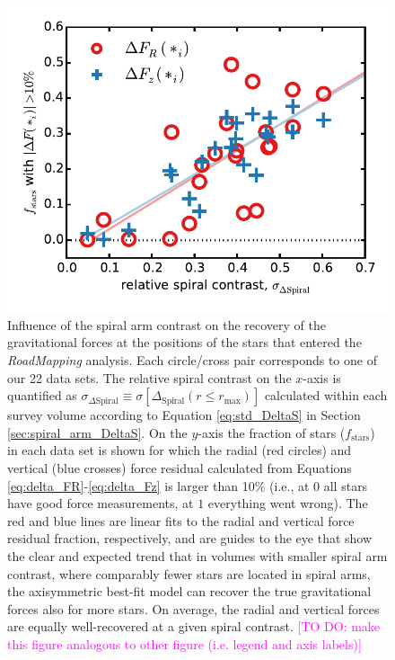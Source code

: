 \documentclass[iop,revtex4,numberedappendix,appendixfloats]{emulateapj}
\newcommand{\RM}{{\sl RoadMapping}}
\newcommand{\Wilma}[1]{\textcolor{Magenta}{#1}}
\begin{document}
\begin{figure}[!htbp]
\centering
\includegraphics[width=\columnwidth]{fig/MNdHHdiffSph2_plot_stdkappa_vs_frac10star_3.pdf}
\caption{Influence of the spiral arm contrast on the recovery of the gravitational forces at the positions of the stars that entered the \RM{} analysis. Each circle/cross pair corresponds to one of our 22 data sets. The relative spiral contrast on the $x$-axis is quantified as $\sigma_{\Delta\text{Spiral}} \equiv \sigma[\Delta_\text{Spiral}(r\leq r_\text{max})]$ calculated within each survey volume according to Equation \eqref{eq:std_DeltaS} in Section \ref{sec:spiral_arm_DeltaS}. On the $y$-axis the fraction of stars ($f_\text{stars}$) in each data set is shown for which the radial (red circles) and vertical (blue crosses) force residual calculated from Equations \eqref{eq:delta_FR}-\eqref{eq:delta_Fz} is larger than 10\% (i.e., at $0$ all stars have good force measurements, at $1$ everything went wrong). The red and blue lines are linear fits to the radial and vertical force residual fraction, respectively, and are guides to the eye that show the clear and expected trend that in volumes with smaller spiral arm contrast, where comparably fewer stars are located in spiral arms, the axisymmetric best-fit model can recover the true gravitational forces also for more stars. On average, the radial and vertical forces are equally well-recovered at a given spiral contrast. \Wilma{[TO DO: make this figure analogous to other figure (i.e. legend and axis labels)]}}
\label{fig:std_DeltaS_vs_frac10_stars}
\end{figure}
\end{document}
